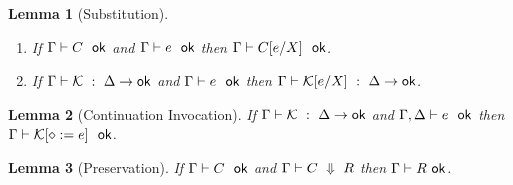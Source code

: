 \documentclass{article}
\newtheorem{lemma}{Lemma}
\newcommand{\C}{C}     %
\newcommand{\X}{X}     %
\newcommand{\R}{R}     %
\newcommand{\KK}{{\cal K}} %
\newcommand{\hole}{\diamond}
\newcommand{\evalto}[3][\G]{#1 \vdash #2 \ \Downarrow\  #3}
\newcommand{\resultok}[2][\G]{#1 \vdash #2 \ \mathsf{ok}}
\newcommand{\eok}[2][\G]{#1 \vdash #2 \ \ \mathsf{ok}}
\newcommand{\cok}[2][\G]{#1 \vdash #2 \ \ \mathsf{ok}}
\newcommand{\kok}[3][\G]{#1 \vdash #3 \ : \ #2\to\mathsf{ok}}
\begin{document}
\begin{lemma}[Substitution]
  \mbox{}
  \begin{enumerate}
    \item If $\cok{\C}$ and $\eok{\e}$ then $\cok{\subst{\C}{\X}{\e}}$.
    \item If $\kok{\D}{\KK}$ and $\eok{\e}$ then $\kok{\D}{\subst{\KK}{\X}{\e}}$.
  \end{enumerate}
\end{lemma}

\begin{lemma}[Continuation Invocation]
  If $\kok{\D}{\KK}$ and $\eok[\G,\D]{\e}$ then $\cok{\KK[\hole:=\e]}$.
\end{lemma}

\begin{lemma}[Preservation]
   If $\cok{\C}$ and $\evalto{\C}{\R}$ then $\resultok{\R}$.
\end{lemma}
\end{document}

